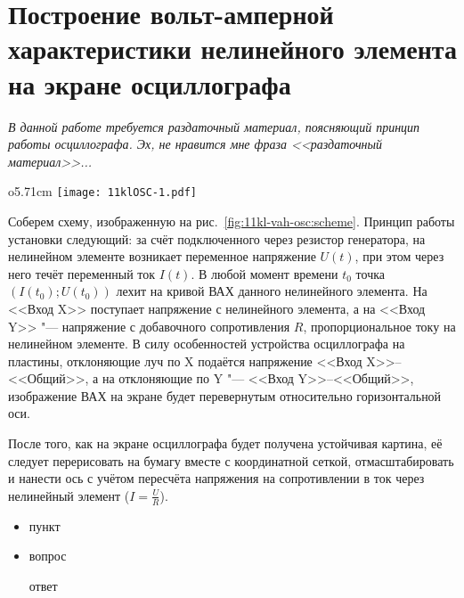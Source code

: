 \section{Построение вольт-амперной характеристики нелинейного элемента на экране осциллографа}
{\itshape В данной работе требуется раздаточный материал, поясняющий принцип работы осциллографа. Эх, не нравится мне фраза <<раздаточный материал>>...}
\SolveVariant
\begin{wrapfigure}{o}{5.71cm}
	\texttt{[image: 11klOSC-1.pdf]}
    \caption{Схема установки}
    \label{fig:11kl-vah-osc:scheme}
\end{wrapfigure}
Соберем схему, изображенную на рис.~\ref{fig:11kl-vah-osc:scheme}. Принцип работы установки следующий: за счёт подключенного через резистор генератора, на нелинейном элементе возникает переменное напряжение \(U(t)\), при этом через него течёт переменный ток \(I(t)\). В любой момент времени \(t_0\) точка \( \left( I(t_0); U(t_0) \right)\) лехит на кривой ВАХ данного нелинейного элемента. На <<Вход X>> поступает напряжение с нелинейного элемента, а на <<Вход Y>> "--- напряжение с добавочного сопротивления \(R\), пропорциональное току на нелинейном элементе. В силу особенностей устройства осциллографа на пластины, отклоняющие луч по X подаётся напряжение <<Вход X>>--<<Общий>>, а на отклоняющие по Y "--- <<Вход Y>>--<<Общий>>, изображение ВАХ на экране будет перевернутым относительно горизонтальной оси.\par
После того, как на экране осциллографа будет получена устойчивая картина, её следует перерисовать на бумагу вместе с координатной сеткой, отмасштабировать и нанести ось с учётом пересчёта напряжения на сопротивлении в ток через нелинейный элемент (\(I = \frac{U}{R}\)).
\MesErrors
\SchoolBase
\begin{itemize}
    \item пункт
\end{itemize}
\AdditionalQuestions
\begin{itemize}
    \item вопрос\par
    \Answer ответ
\end{itemize}
